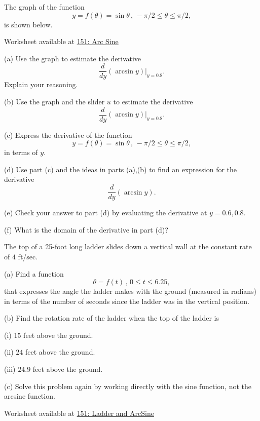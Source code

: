 \documentclass{ximera}
\begin{document}
\begin{question}   \label{Q:34fgt44}
The graph of the function
\[
 y  = f(\theta) = \sin \theta \, , \, -\pi/2 \leq \theta \leq \pi/2 ,
\]
is shown below.

\begin{onlineOnly}
    \begin{center}
\end{center}
\end{onlineOnly}

Worksheet available at \href{https://www.desmos.com/calculator/lxwoeir1pt}{151: Arc Sine}


(a) Use the graph to estimate the derivative 
\[
      \frac{d}{dy} \left(   \arcsin y  \right)\Big|_{y=0.8} .
\]
Explain your reasoning.

(b) Use the graph and the slider $u$ to estimate the derivative
\[
      \frac{d}{dy} \left(   \arcsin y  \right)\Big|_{y=0.8} .
\]

(c) Express the derivative of the function 
\[
 y  = f(\theta) = \sin \theta \, , \, -\pi/2 \leq \theta \leq \pi/2 ,
\]
in terms of $y$.

(d) Use part (c) and the ideas in parts (a),(b) to find an expression for the derivative
\[
   \frac{d}{dy} \left(   \arcsin y  \right) .
\]

(e) Check your answer to part (d) by evaluating the derivative at $y=0.6, 0.8$.

(f) What is the domain of the derivative in part (d)?
\end{question}


\begin{question}  \label{Q:dfbhhyh5g5tr231}

The top of a 25-foot long ladder slides down a vertical wall at the constant rate of $4$ ft/sec. 

(a) Find a function 
\[
       \theta = f(t) \, , \, 0\leq t \leq 6.25 ,
\]
that expresses the angle the ladder makes with the ground (measured in radians) in terms of the number of seconds since the ladder was in the vertical position.

(b) Find the rotation rate of the ladder when the top of the ladder is 

     (i) $15$ feet above the ground. 

     (ii) $24$ feet above the ground.

     (iii) $24.9$ feet above the ground.


(c) Solve this problem again by working directly with the sine function, not the arcsine function.

 


\begin{onlineOnly}
    \begin{center}
\end{center}
\end{onlineOnly}

Worksheet available at \href{https://www.desmos.com/calculator/5c4lssovbi}{151: Ladder and ArcSine}

\end{question}
\end{document}
